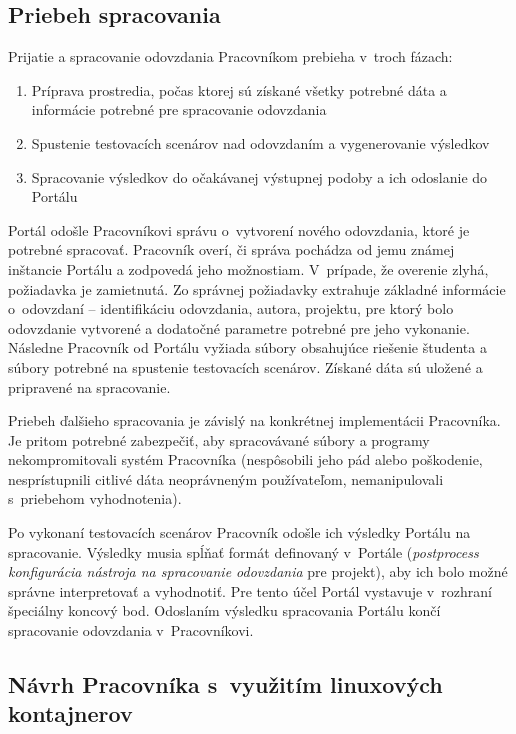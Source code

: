 \documentclass[
  digital, %
  oneside, %
  table,   %
  lof,     %
  lot,   %
]{fithesis3}
\begin{document}
\subsection{Priebeh spracovania}

Prijatie a spracovanie odovzdania Pracovníkom prebieha v~troch fázach:

\begin{enumerate}
    \item Príprava prostredia, počas ktorej sú získané všetky potrebné dáta a informácie potrebné pre spracovanie odovzdania
    \item Spustenie testovacích scenárov nad odovzdaním a vygenerovanie výsledkov
    \item Spracovanie výsledkov do očakávanej výstupnej podoby a ich odoslanie do Portálu
\end{enumerate}

Portál odošle Pracovníkovi správu o~vytvorení nového odovzdania, ktoré je potrebné spracovať. Pracovník overí, či správa pochádza od jemu známej inštancie Portálu a zodpovedá jeho možnostiam.  V~prípade, že overenie zlyhá, požiadavka je zamietnutá. Zo správnej požiadavky extrahuje základné informácie o~odovzdaní -- identifikáciu odovzdania, autora, projektu, pre ktorý bolo odovzdanie vytvorené a dodatočné parametre potrebné pre jeho vykonanie. Následne Pracovník od Portálu vyžiada súbory obsahujúce riešenie študenta a súbory potrebné na spustenie testovacích scenárov. Získané dáta sú uložené a pripravené na spracovanie. 

Priebeh ďalšieho spracovania je závislý na konkrétnej implementácii Pracovníka. Je pritom potrebné zabezpečiť, aby spracovávané súbory a programy nekompromitovali systém Pracovníka (nespôsobili jeho pád alebo poškodenie, nesprístupnili citlivé dáta neoprávneným používateľom, nemanipulovali s~priebehom vyhodnotenia). 

Po vykonaní testovacích scenárov Pracovník odošle ich výsledky Portálu na spracovanie. Výsledky musia spĺňať formát definovaný v~Portále (\emph{postprocess konfigurácia nástroja na spracovanie odovzdania} pre projekt), aby ich bolo možné správne interpretovať a vyhodnotiť. Pre tento účel Portál vystavuje v~rozhraní špeciálny koncový bod. Odoslaním výsledku spracovania Portálu končí spracovanie odovzdania v~Pracovníkovi.

\subsection{Návrh Pracovníka s~využitím linuxových kontajnerov}
\label{design-worker-lc}
\end{document}
